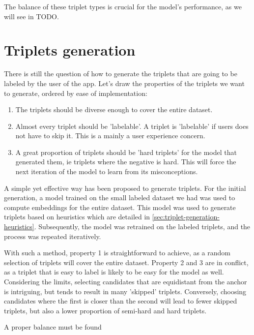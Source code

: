 The balance of these triplet types is crucial for the model's performance, as we will see in TODO.

\section{Triplets generation}
\label{sec:triplet-generation}

There is still the question of how to generate the triplets that are going to be labeled by the user of the app. Let's draw the properties of the triplets we want to generate, ordered by ease of implementation:
\begin{enumerate}
  \item The triplets should be diverse enough to cover the entire dataset.
  \item Almost every triplet should be 'labelable'. A triplet is 'labelable' if users does not have to skip it. This is a mainly a user experience concern. 
  \item A great proportion of triplets should be 'hard triplets' for the model that generated them, ie triplets where the negative is hard. This will force the next iteration of the model to learn from its misconceptions.
\end{enumerate}


A simple yet effective way has been proposed to generate triplets. For the initial generation, a model trained on the small labeled dataset we had was used to compute embeddings for the entire dataset. This model was used to generate triplets based on heuristics which are detailed in \autoref{sec:triplet-generation-heuristics}. Subsequently, the model was retrained on the labeled triplets, and the process was repeated iteratively.

With such a method, property 1 is straightforward to achieve, as a random selection of triplets will cover the entire dataset. Property 2 and 3 are in conflict, as a triplet that is easy to label is likely to be easy for the model as well. Considering the limits, selecting candidates that are equidistant from the anchor is intriguing, but tends to result in many 'skipped' triplets. Conversely, choosing candidates where the first is closer than the second will lead to fewer skipped triplets, but also a lower proportion of semi-hard and hard triplets.

A proper balance must be found


